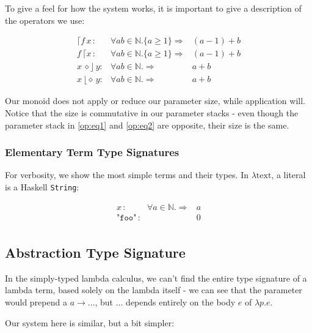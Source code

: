 \documentclass{article}
\begin{document}
\begin{flushleft}
To give a feel for how the system works, it is important to give a description
of the operators we use:
\end{flushleft}

\begin{align}
\lceil f \, x \, :
  & \forall a b \in \mathbb{N}. \{a \geq 1\} \Rightarrow & (a-1) + b \label{op:eq1}\\
f \, \lceil x \, :
  & \forall a b \in \mathbb{N}. \{a \geq 1\} \Rightarrow & (a-1) + b \label{op:eq2}\\
x \, \diamond \rfloor \, y :
  & \forall a b \in \mathbb{N}. \Rightarrow              & a + b\\
x \, \lfloor \diamond \, y :
  & \forall a b \in \mathbb{N}. \Rightarrow              & a + b
\end{align}

\begin{flushleft}
Our monoid does not apply or reduce our parameter size, while application will.
Notice that the size is commutative in our parameter stacks - even though
the parameter stack in \ref{op:eq1} and \ref{op:eq2} are opposite, their size
is the same.
\end{flushleft}

\subsubsection{Elementary Term Type Signatures}

For verbosity, we show the most simple terms and their types. In
$\lambda\mathrm{text}$, a literal is a Haskell \texttt{String}:

\begin{align}
x \, :
  & \forall a \in \mathbb{N}. \Rightarrow & a\\
\mathrm{\texttt{"foo"}} \, :            & & 0\\
\end{align}

\subsection{Abstraction Type Signature}

\begin{flushleft}
In the simply-typed lambda calculus, we can't find the entire type signature
of a lambda term, based solely on the lambda itself - we can see that the
parameter would prepend a $a \rightarrow \ldots$, but $\ldots$ depends entirely
on the body $e$ of $\lambda p.e$.

Our system here is similar, but a bit simpler:
\end{flushleft}
\end{document}
